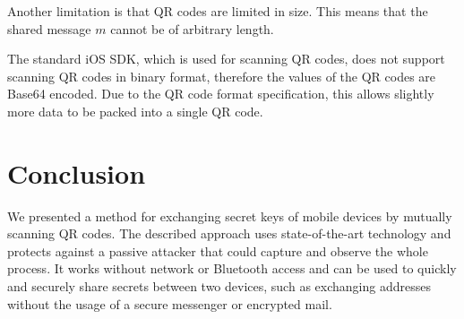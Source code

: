 Another limitation is that QR codes are limited in size.
This means that the shared message $m$ cannot be of arbitrary length.

The standard iOS SDK, which is used for scanning QR codes, does not support scanning QR codes in binary format, therefore the values of the QR codes are Base64 encoded.
Due to the QR code format specification, this allows slightly more data to be packed into a single QR code.


\section{Conclusion}

We presented a method for exchanging secret keys of mobile devices by mutually scanning QR codes.
The described approach uses state-of-the-art technology and protects against a passive attacker that could capture and observe the whole process.
It works without network or Bluetooth access and can be used to quickly and securely share secrets between two devices, such as exchanging addresses without the usage of a secure messenger or encrypted mail.
